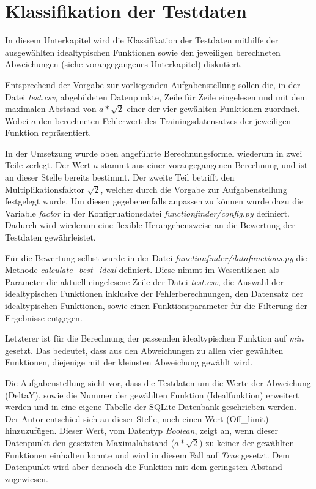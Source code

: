 \section{Klassifikation der Testdaten}

In diesem Unterkapitel wird die Klassifikation der Testdaten mithilfe der ausgewählten idealtypischen Funktionen sowie den jeweiligen berechneten Abweichungen (siehe vorangegangenes Unterkapitel) diskutiert.

Entsprechend der Vorgabe zur vorliegenden Aufgabenstellung sollen die, in der Datei \emph{test.csv}, abgebildeten Datenpunkte, Zeile für Zeile eingelesen und mit dem maximalen Abstand von $ a*\sqrt{2}$ einer der vier gewählten Funktionen zuordnet. Wobei $a$ den berechneten Fehlerwert des Trainingsdatensatzes der jeweiligen Funktion repräsentiert.

In der Umsetzung wurde oben angeführte Berechnungsformel wiederum in zwei Teile zerlegt. Der Wert $a$ stammt aus einer vorangegangenen Berechnung und ist an dieser Stelle bereits bestimmt. Der zweite Teil betrifft den Multiplikationsfaktor $\sqrt{2}$, welcher durch die Vorgabe zur Aufgabenstellung festgelegt wurde. Um diesen gegebenenfalls anpassen zu können wurde dazu die Variable \emph{factor} in der Konfigruationsdatei \emph{functionfinder/config.py} definiert. Dadurch wird wiederum eine flexible Herangehensweise an die Bewertung der Testdaten gewährleistet.

Für die Bewertung selbst wurde in der Datei \emph{functionfinder/datafunctions.py} die Methode \emph{calculate\_best\_ideal} definiert. Diese nimmt im Wesentlichen als Parameter die aktuell eingelesene Zeile der Datei \emph{test.csv}, die Auswahl der idealtypischen Funktionen inklusive der Fehlerberechnungen, den Datensatz der idealtypischen Funktionen, sowie einen Funktionsparameter für die Filterung der Ergebnisse entgegen. 

Letzterer ist für die Berechnung der passenden idealtypischen Funktion auf \emph{min} gesetzt. Das bedeutet, dass aus den Abweichungen zu allen vier gewählten Funktionen, diejenige mit der kleinsten Abweichung gewählt wird.

Die Aufgabenstellung sieht vor, dass die Testdaten um die Werte der Abweichung (DeltaY), sowie die Nummer der gewählten Funktion (Idealfunktion) erweitert werden und in eine eigene Tabelle der SQLite Datenbank geschrieben werden. Der Autor entschied sich an dieser Stelle, noch einen Wert (Off\_limit) hinzuzufügen. Dieser Wert, vom Datentyp \emph{Boolean}, zeigt an, wenn dieser Datenpunkt den gesetzten Maximalabstand ($a*\sqrt{2}$) zu keiner der gewählten Funktionen einhalten konnte und wird in diesem Fall auf \emph{True} gesetzt. Dem Datenpunkt wird aber dennoch die Funktion mit dem geringsten Abstand zugewiesen.

